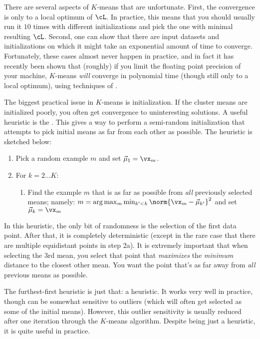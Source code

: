 There are several aspects of $K$-means that are unfortunate.  First,
the convergence is only to a local optimum of $\cL$.  In practice,
this means that you should usually run it $10$ times with different
initializations and pick the one with minimal resulting $\cL$.
Second, one can show that there are input datasets and initializations
on which it might take an exponential amount of time to converge.
Fortunately, these cases almost never happen in practice, and in fact
it has recently been shown that (roughly) if you limit the floating
point precision of your machine, $K$-means \emph{will} converge in
polynomial time (though still only to a local optimum), using
techniques of .

The biggest practical issue in $K$-means is initialization.  If the
cluster means are initialized poorly, you often get convergence to
uninteresting solutions.  A useful heuristic is the
.  This gives a way to perform a
semi-random initialization that attempts to pick initial means as far
from each other as possible.  The heuristic is sketched below:
%
\begin{enumerate}
  \item Pick a random example $m$ and set $\vec\mu_1 = \vx_m$.
  \item For $k = 2 \dots K$:
    \begin{enumerate}
      \item Find the example $m$ that is as far as possible from
        \emph{all} previously selected means; namely:
          $m = \arg\max_m \min_{k' < k} \norm{ \vx_m - \vec\mu_{k'} }^2$
          and set $\vec\mu_k = \vx_m$
    \end{enumerate}
\end{enumerate}
%
In this heuristic, the only bit of randomness is the selection of the
first data point.  After that, it is completely deterministic (except
in the rare case that there are multiple equidistant points in step
2a).  It is extremely important that when selecting the $3$rd mean,
you select that point that \emph{maximizes} the \emph{minimum}
distance to the closest other mean.  You want the point that's as far
away from \emph{all} previous means as possible.

The furthest-first heuristic is just that: a heuristic.  It works very
well in practice, though can be somewhat sensitive to outliers (which
will often get selected as some of the initial means).  However, this
outlier sensitivity is usually reduced after one iteration through the
$K$-means algorithm.  Despite being just a heuristic, it is quite
useful in practice.


